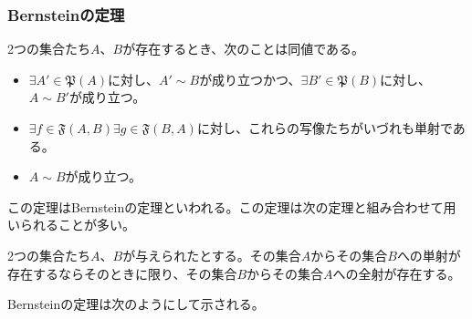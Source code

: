 \documentclass[dvipdfmx]{jsarticle}
\begin{document}
\subsubsection{Bernsteinの定理}%
\begin{thm}[Bernsteinの定理]\label{1.2.7.2}
2つの集合たち$A$、$B$が存在するとき、次のことは同値である。
\begin{itemize}
\item
  $\exists A'\in \mathfrak{P}(A)$に対し、$A' \sim B$が成り立つかつ、$\exists B'\in \mathfrak{P}(B)$に対し、$A \sim B'$が成り立つ。
\item
  $\exists f\in \mathfrak{F}(A,B)\exists g \in \mathfrak{F}(B,A)$に対し、これらの写像たちがいづれも単射である。
\item
  $A \sim B$が成り立つ。
\end{itemize}\par
\end{thm}\par
この定理はBernsteinの定理といわれる。この定理は次の定理と組み合わせて用いられることが多い。
\begin{thm*}
2つの集合たち$A$、$B$が与えられたとする。その集合$A$からその集合$B$への単射が存在するならそのときに限り、その集合$B$からその集合$A$への全射が存在する。
\end{thm*}\par
Bernsteinの定理は次のようにして示される。
\end{document}
